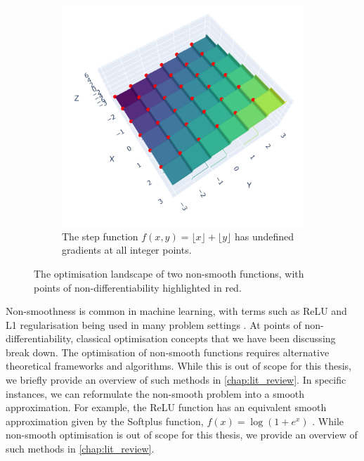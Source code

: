 \begin{figure}[h]
\begin{subfigure}[b]{0.48\linewidth}
        \includegraphics[width=\linewidth]{figures/2background/floor_func.png}
        \caption{The step function
        $f(x,y) = \lfloor x \rfloor + \lfloor y \rfloor$ has undefined gradients at all integer points.}
        \label{fig:step_function}
    \end{subfigure}
    \caption{The optimisation landscape of two non-smooth functions, with points of non-differentiability highlighted in red.}
    \label{fig:non_smooth_functions}
\end{figure}

Non-smoothness is common in machine learning, with terms such as ReLU and L1 regularisation being used in many problem settings \citep{deep_learning_book, mml_book}. At points of non-differentiability, classical optimisation concepts that we have been discussing break down. The optimisation of non-smooth functions requires alternative theoretical frameworks and algorithms. While this is out of scope for this thesis, we briefly provide an overview of such methods in 
\cref{chap:lit_review}. In specific instances, we can reformulate the non-smooth problem into a smooth approximation. For example, the ReLU function has an equivalent smooth approximation given by the Softplus function, $f(x) = \log(1 + e^x)$ \citep{deep_learning_book} \citep{pytorch}. While non-smooth optimisation is out of scope for this thesis, we provide an overview of such methods in \cref{chap:lit_review}.

